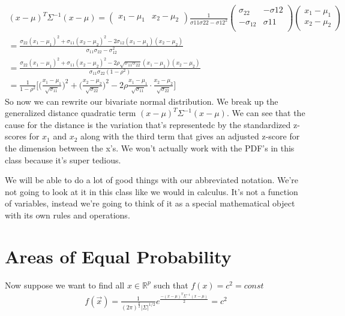 \begin{align*}
    (x-\mu)^T\Sigma^{-1}(x-\mu) = 
    \begin{pmatrix} x_1 - \mu_1 & x_2 - \mu_2 \end{pmatrix} 
    \frac{1}{\sigma{11}\sigma{22}-\sigma{12}^2}
    \begin{pmatrix}
    \sigma_{22} & -\sigma{12} \\
    -\sigma_{12} & \sigma{11} \\
    \end{pmatrix}
    \begin{pmatrix} x_1 - \mu_1 \\ x_2 - \mu_2 \end{pmatrix}\\
    =\frac{\sigma_{22}(x_1-\mu_1)^2+\sigma_{11}(x_2-\mu_2)^2 - 2\sigma_{12}(x_1-\mu_1)(x_2-\mu_2)}{\sigma_{11}\sigma_{22}-\sigma_{12}^2}\\
    =\frac{\sigma_{22}(x_1-\mu_1)^2+\sigma_{11}(x_2-\mu_2)^2 - 2\rho\sqrt{\sigma_{11}\sigma_{22}}(x_1-\mu_1)(x_2-\mu_2)}{\sigma_{11}\sigma_{22}(1-\rho^2)}\\
    =\frac{1}{1-\rho^2}\Bigg[\Big( 
    \frac{x_1-\mu_1}{\sqrt{\sigma_{11}}}
    \Big)^2
    +\Big( 
    \frac{x_2-\mu_2}{\sqrt{\sigma_{22}}}
    \Big)^2
    -2\rho\frac{x_1-\mu_1}{\sqrt{\sigma_{11}}}\cdot\frac{x_2-\mu_2}{\sqrt{\sigma_{22}}}
    \Bigg]
\end{align*}
So now we can rewrite our bivariate normal distribution. We break up the generalized distance quadratic term $(x-\mu)^T\Sigma^{-1}(x-\mu)$. We can see that the cause for the distance is the variation that's representedc by the standardized z-scores for $x_1$ and $x_2$ along with the third term that gives an adjusted z-score for the dimension between the x's. We won't actually work with the PDF's in this class because it's super tedious.

We will be able to do a lot of good things with our abbreviated notation. We're not going to look at it in this class like we would in calculus. It's not a function of variables, instead we're going to think of it as a special mathematical object with its own rules and operations.

\section{Areas of Equal Probability}
Now suppose we want to find all $x\in \mathbb{R}^p$ such that $f(x) = c^2 = const$
\begin{align*}
    f(\Vec{x})= \frac{1}{(2\pi)^{\frac{p}{2}}|\Sigma|^{1/2}}e^\frac{{-(x-\mu)^T\Sigma^{-1}(x-\mu)}}{2} =c^2
\end{align*}

